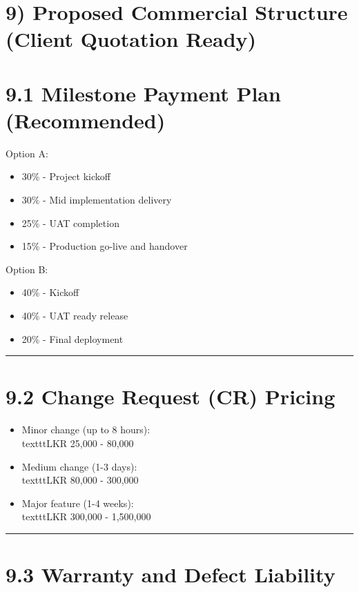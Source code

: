\documentclass[11pt,a4paper]{article}
\begin{document}
\section{9) Proposed Commercial Structure (Client Quotation Ready)}

\section{9.1 Milestone Payment Plan (Recommended)}

Option A:\\

\begin{itemize}
\item 30\% - Project kickoff
\item 30\% - Mid implementation delivery
\item 25\% - UAT completion
\item 15\% - Production go-live and handover
\end{itemize}

Option B:\\

\begin{itemize}
\item 40\% - Kickoff
\item 40\% - UAT ready release
\item 20\% - Final deployment
\end{itemize}

\bigskip\hrule\bigskip

\section{9.2 Change Request (CR) Pricing}

\begin{itemize}
\item Minor change (up to 8 hours): \\texttt{LKR 25,000 - 80,000}
\item Medium change (1-3 days): \\texttt{LKR 80,000 - 300,000}
\item Major feature (1-4 weeks): \\texttt{LKR 300,000 - 1,500,000}
\end{itemize}

\bigskip\hrule\bigskip

\section{9.3 Warranty and Defect Liability}
\end{document}
